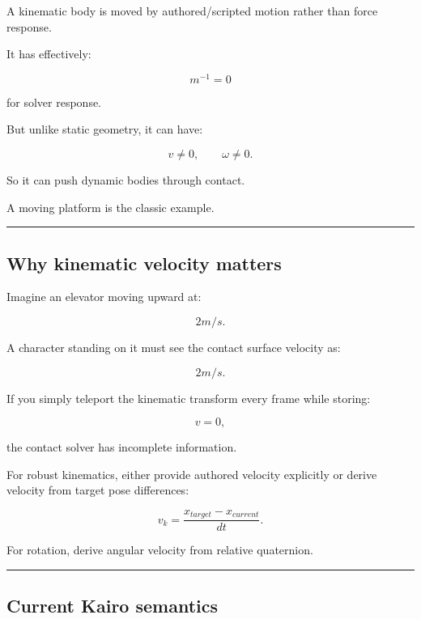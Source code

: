 \hypertarget{06-engine-ii-ch037-part-1659-kinematic-semantics}{}

A kinematic body is moved by authored/scripted motion rather than force response.

It has effectively:

\[
m^{-1}=0
\]

for solver response.

But unlike static geometry, it can have:

\[
v\neq0,
\qquad
\omega\neq0.
\]

So it can push dynamic bodies through contact.

A moving platform is the classic example.

\begin{center}\rule{0.5\linewidth}{0.5pt}\end{center}

\subsection{Why kinematic velocity matters}\label{06-engine-ii-ch037-why-kinematic-velocity-matters}

\hypertarget{06-engine-ii-ch037-why-kinematic-velocity-matters}{}

Imagine an elevator moving upward at:

\[
2m/s.
\]

A character standing on it must see the contact surface velocity as:

\[
2m/s.
\]

If you simply teleport the kinematic transform every frame while storing:

\[
v=0,
\]

the contact solver has incomplete information.

For robust kinematics, either provide authored velocity explicitly or derive velocity from target pose differences:

\[
v_k
=
\frac{x_{target}-x_{current}}{dt}.
\]

For rotation, derive angular velocity from relative quaternion.

\begin{center}\rule{0.5\linewidth}{0.5pt}\end{center}

\subsection{Current Kairo semantics}\label{06-engine-ii-ch037-current-kairo-semantics}

